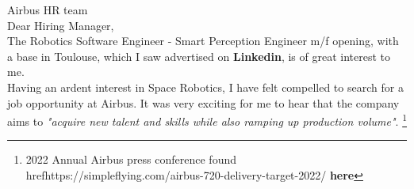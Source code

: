 Airbus HR team\\
\vspace{0.7cm}
Dear Hiring Manager,\\
\vspace{0.4cm}
The Robotics Software Engineer - Smart Perception Engineer m/f  opening, with a base in Toulouse,
 which I saw advertised on \textbf{Linkedin}, is of great interest to me.\\\smallskip
Having an ardent interest in Space Robotics,
 I have felt compelled to search for a job opportunity at Airbus.
It was very exciting for me to hear that the company aims to
 \textit{"acquire new talent and skills while also ramping up production volume"}.
  \footnote{2022 Annual Airbus press conference found
  href{https://simpleflying.com/airbus-720-delivery-target-2022/}
  {\textbf{here}}}\\\smallskip
